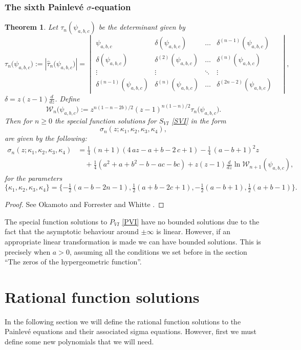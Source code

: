 \documentclass[12pt]{article}
\def\P{Painlev\'e }
\newtheorem{mydef}{Theorem}[section]
\numberwithin{figure}{section}
\numberwithin{equation}{section}
\numberwithin{table}{section}
\begin{document}
\subsubsection{The sixth \P $\sigma$-equation}
\begin{mydef}
Let $\tau_n(\psi_{a,b,c})$ be the determinant given by
\[
\tau_n\big(\psi_{a,b,c}\big):=|\hat\tau_n\big(\psi_{a,b,c}\big)|=
\!\begin{vmatrix}
\psi_{a,b,c} & \delta(\psi_{a,b,c}) &\hdots& \delta^{(n-1)}(\psi_{a,b,c}) \\
\delta(\psi_{a,b,c}) & \delta^{(2)}(\psi_{a,b,c}) &\hdots& \delta^{(n)}(\psi_{a,b,c})  \\
\vdots &\vdots & \ddots & \vdots & \\
\delta^{(n-1)}(\psi_{a,b,c}) & \delta^{(n)}(\psi_{a,b,c}) &\hdots& \delta^{(2n-2)}(\psi_{a,b,c})
\end{vmatrix},
\]
$\delta=z(z-1)\frac{d}{dz}$.
Define
$$\mathcal{ W}_n\big(\psi_{a,b,c}\big):=z^{{n}(1-n-2b)/2}(z-1)^{n(1-n)/2}\tau_n\big(\psi_{a,b,c}\big).$$
Then for $n\geq0$ the special function solutions for $S_{VI}$ \eqref{SVI} in the form $$\sigma_n(z;\kappa_1,\kappa_2,\kappa_3,\kappa_4),$$ are given by the following:
\begin{align*}
\sigma_n(z;\kappa_1,\kappa_2,\kappa_3,\kappa_4)&=\tfrac{1}{4}\,(n+1) \left( 4\,az-a+b-2\,c+1 \right) -\tfrac{1}{4}\, \left(a-b+1\right) ^{2
}z
\\
&\quad+\tfrac{1}{4} \left(a^2+a+b^2-b-ac-bc\right)+z(z-1)\frac{d}{dz}\ln\mathcal{ W}_{n+1}(\psi_{a,b,c}),
\end{align*}
for the parameters
$$
\{\kappa_1,\kappa_2,\kappa_3,\kappa_4\}=\{-\tfrac{1}{2}(a-b-2n-1),\tfrac{1}{2}(a+b-2c+1),-\tfrac{1}{2}(a-b+1),\tfrac{1}{2}(a+b-1)\}.
$$
\end{mydef}
\begin{proof}
See Okamoto \cite{P:146:337} and Forrester and Whitte \cite{P:174:114}.
\end{proof}
The special function solutions to $P_{VI}$ \eqref{PVI} have no bounded solutions due to the fact that the asymptotic behaviour around $\pm\infty$ is linear. However, if an appropriate linear transformation is made we can have bounded solutions. This is precisely when $a>0$, assuming all the conditions we set before in the section ``The zeros of the hypergeometric function''.
\newpage\section{Rational function solutions}
In the following section we will define the rational function solutions to the \P equations and their associated sigma equations. However, first we must define some new polynomials that we will need.
\end{document}
